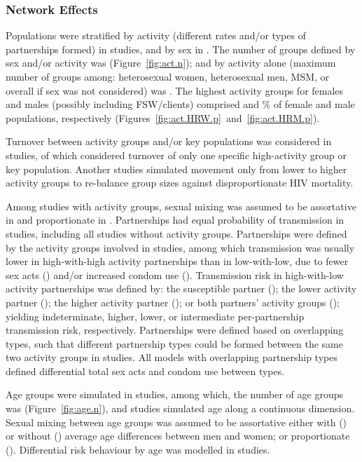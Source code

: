 \subsubsection{Network Effects}
\label{sss:res:network}
Populations were stratified by activity (different rates and/or types of partnerships formed)
in  studies, and by sex in .
The number of groups defined by sex and/or activity was   (Figure~\ref{fig:act.n});
and by activity alone (maximum number of groups among:
heterosexual women, heterosexual men, MSM, or overall if sex was not considered) was .
The highest activity groups for females and males (possibly including FSW/clients) comprised
 and \% of female and male populations, respectively
(Figures~\ref{fig:act.HRW.p}~and~\ref{fig:act.HRM.p}).
\par
Turnover between activity groups and/or key populations
was considered in  studies,
of which  considered turnover of only
one specific high-activity group or key population.
Another  studies simulated
movement only from lower to higher activity groups
to re-balance group sizes against disproportionate HIV mortality.
\par
Among  studies with activity groups, sexual mixing was assumed to be
assortative in  and proportionate in .
Partnerships had equal probability of transmission in  studies,
including all studies without activity groups.
Partnerships were defined by the activity groups involved in  studies,
among which transmission was usually
lower in high-with-high activity partnerships than in low-with-low, due to
fewer sex acts () and/or increased condom use ().
Transmission risk in high-with-low activity partnerships was defined by:
the susceptible partner ();
the lower activity partner ();
the higher activity partner (); or
both partners' activity groups ();
yielding indeterminate, higher, lower, or intermediate
per-partnership transmission risk, respectively.
Partnerships were defined based on overlapping types, such that
different partnership types could be formed between the same two activity groups in  studies.
All models with overlapping partnership types defined differential total sex acts and condom use between types.
\par
Age groups were simulated in  studies, among which,
the number of age groups was  (Figure~\ref{fig:age.n}),
and  studies simulated age along a continuous dimension.
Sexual mixing between age groups was assumed to be assortative
either with () or without ()
average age differences between men and women;
or proportionate ().
Differential risk behaviour by age was modelled in  studies.
